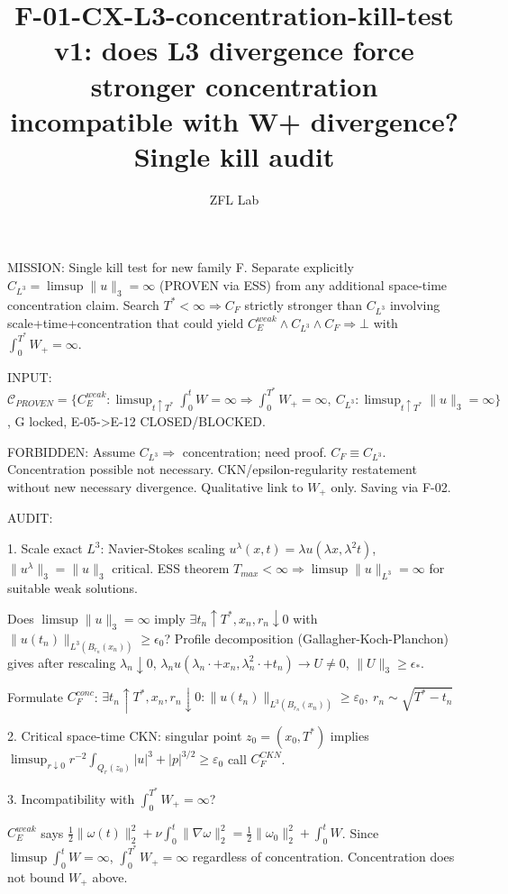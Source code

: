 \documentclass[11pt]{article}
\title{F-01-CX-L3-concentration-kill-test v1: does L3 divergence force stronger concentration incompatible with W+ divergence? Single kill audit}
\author{ZFL Lab}
\begin{document}
\maketitle

MISSION: Single kill test for new family F. Separate explicitly $C_{L^3}=\limsup\|u\|_3=\infty$ (PROVEN via ESS) from any additional space-time concentration claim. Search $T^*<\infty\Rightarrow C_F$ strictly stronger than $C_{L^3}$ involving scale+time+concentration that could yield $C_E^{weak}\land C_{L^3}\land C_F\Rightarrow\bot$ with $\int_0^{T^*}W_+=\infty$.

INPUT: $\mathcal{C}_{PROVEN}=\{C_E^{weak}:\limsup_{t\uparrow T^*}\int_0^t W=\infty\Rightarrow\int_0^{T^*}W_+=\infty,\ C_{L^3}:\limsup_{t\uparrow T^*}\|u\|_3=\infty\}$, G locked, E-05->E-12 CLOSED/BLOCKED.

FORBIDDEN:
Assume $C_{L^3}\Rightarrow$ concentration; need proof.
$C_F\equiv C_{L^3}$.
Concentration possible not necessary.
CKN/epsilon-regularity restatement without new necessary divergence.
Qualitative link to $W_+$ only.
Saving via F-02.

AUDIT:

1. Scale exact $L^3$: Navier-Stokes scaling $u^\lambda(x,t)=\lambda u(\lambda x,\lambda^2 t)$, $\|u^\lambda\|_3=\|u\|_3$ critical. ESS theorem $T_{max}<\infty\Rightarrow\limsup\|u\|_{L^3}=\infty$ for suitable weak solutions.

Does $\limsup\|u\|_3=\infty$ imply $\exists t_n\uparrow T^*, x_n, r_n\downarrow0$ with $\|u(t_n)\|_{L^3(B_{r_n}(x_n))}\ge\epsilon_0$? Profile decomposition (Gallagher-Koch-Planchon) gives after rescaling $\lambda_n\downarrow0$, $\lambda_n u(\lambda_n\cdot+x_n,\lambda_n^2\cdot+t_n)\to U\neq0$, $\|U\|_3\ge\epsilon_*$.

Formulate $C_F^{conc}$:
$\boxed{\exists t_n\uparrow T^*, x_n, r_n\downarrow0: \|u(t_n)\|_{L^3(B_{r_n}(x_n))}\ge\varepsilon_0,\ r_n\sim\sqrt{T^*-t_n}}$

2. Critical space-time CKN: singular point $z_0=(x_0,T^*)$ implies
$\boxed{\limsup_{r\downarrow0} r^{-2}\int_{Q_r(z_0)}|u|^3+|p|^{3/2}\ge\varepsilon_0}$ call $C_F^{CKN}$.

3. Incompatibility with $\int_0^{T^*}W_+=\infty$?

$C_E^{weak}$ says $\frac12\|\omega(t)\|_2^2+\nu\int_0^t\|\nabla\omega\|_2^2=\frac12\|\omega_0\|_2^2+\int_0^t W$. Since $\limsup\int_0^t W=\infty$, $\int_0^{T^*}W_+=\infty$ regardless of concentration. Concentration does not bound $W_+$ above.
\end{document}
